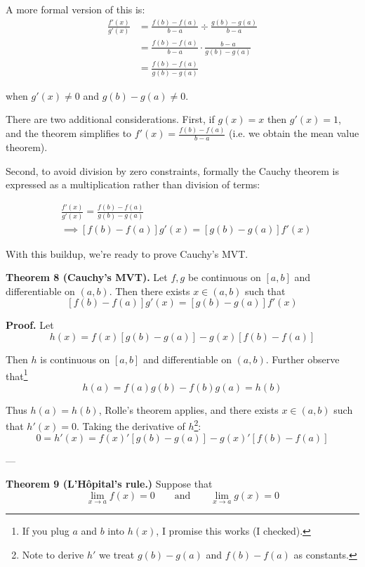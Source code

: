 \vs

A more formal version of this is:
\begin{align*}
  \frac{f'(x)}{g'(x)}&=\frac{f(b)-f(a)}{b-a}\div \frac{g(b)-g(a)}{b-a}\\
                     &=\frac{f(b)-f(a)}{b-a}\cdot \frac{b-a}{g(b)-g(a)}\\
                     &=\frac{f(b)-f(a)}{g(b)-g(a)}
\end{align*}

when $g'(x)\neq 0$ and $g(b)-g(a)\neq0$.

\vs

There are two additional considerations. First, if $g(x)=x$ then
$g'(x)=1$, and the theorem simplifies to $f'(x)=\frac{f(b)-f(a)}{b-a}$
(i.e. we obtain the mean value theorem).

\vs

Second, to avoid division by zero constraints, formally the Cauchy
theorem is expressed as a multiplication rather than division of
terms:

\begin{align*}
  &\frac{f'(x)}{g'(x)}=\frac{f(b)-f(a)}{g(b)-g(a)}\\
  &\implies [f(b)-f(a)]g'(x)=[g(b)-g(a)]f'(x)
\end{align*}

With this buildup, we're ready to prove Cauchy's MVT.

\vs

\textbf{Theorem 8 (Cauchy's MVT).} Let $f,g$ be continuous on $[a,b]$
and differentiable on $(a,b)$. Then there exists $x\in(a,b)$ such that
\[[f(b)-f(a)]g'(x)=[g(b)-g(a)]f'(x)\]

\vs

\textbf{Proof.} Let
\[h(x)=f(x)[g(b)-g(a)]-g(x)[f(b)-f(a)]\]

Then $h$ is continuous on $[a,b]$ and differentiable on $(a,b)$.
Further observe that\footnote{If you plug $a$ and $b$ into $h(x)$, I
  promise this works (I checked).}
\[h(a)=f(a)g(b)-f(b)g(a)=h(b)\]

Thus $h(a)=h(b)$, Rolle's theorem applies, and there exists
$x\in(a,b)$ such that $h'(x)=0$. Taking the derivative of
$h$\footnote{Note to derive $h'$ we treat $g(b)-g(a)$ and $f(b)-f(a)$
  as constants.}:
\[0=h'(x)=f(x)'[g(b)-g(a)]-g(x)'[f(b)-f(a)]\]

---\vs

\textbf{Theorem 9 (L'H\^opital's rule.)} Suppose that
\[\lim_{x\to a}f(x)=0\qquad\text{and}\qquad\lim_{x\to a}g(x)=0\]

